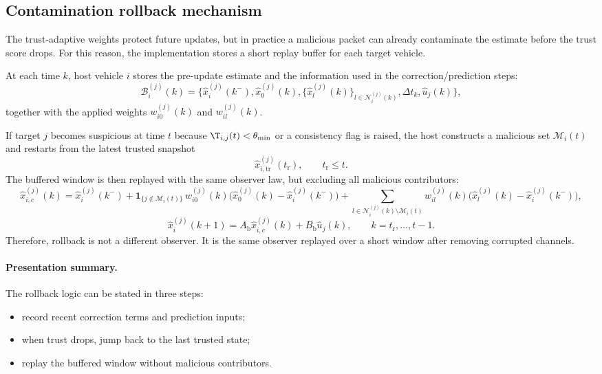 \subsection{Contamination rollback mechanism}\label{subsec:rollback}
The trust-adaptive weights protect future updates, but in practice a malicious packet can already contaminate the estimate before the trust score drops. For this reason, the implementation stores a short replay buffer for each target vehicle.

At each time $k$, host vehicle $i$ stores the pre-update estimate and the information used in the correction/prediction steps:
\begin{equation}\label{eq:rollback_buffer}
\mathcal{B}_{i}^{(j)}(k)=
\Big\{
\hat{x}_{i}^{(j)}(k^{-}),
\hat{x}_{0}^{(j)}(k),
\{\hat{x}_{l}^{(j)}(k)\}_{l\in\mathcal{N}_{i}^{(j)}(k)},
\Delta t_k,
\hat{u}_j(k)
\Big\},
\end{equation}
together with the applied weights $w_{i0}^{(j)}(k)$ and $w_{il}^{(j)}(k)$.

If target $j$ becomes suspicious at time $t$ because $\T_{i,j}(t)<\theta_{\min}$ or a consistency flag is raised, the host constructs a malicious set $\mathcal{M}_{i}(t)$ and restarts from the latest trusted snapshot
\begin{equation}
\hat{x}_{i,\mathrm{tr}}^{(j)}(t_{\mathrm{r}}), \qquad t_{\mathrm{r}}\le t.
\end{equation}
The buffered window is then replayed with the same observer law, but excluding all malicious contributors:
\begin{equation}\label{eq:rollback_correction}
\hat{x}_{i,c}^{(j)}(k)=
\hat{x}_{i}^{(j)}(k^{-})
+\mathbf{1}_{\{j\notin\mathcal{M}_{i}(t)\}}\,
w_{i0}^{(j)}(k)\big(\hat{x}_{0}^{(j)}(k)-\hat{x}_{i}^{(j)}(k^{-})\big)
+\sum_{l\in\mathcal{N}_{i}^{(j)}(k)\setminus\mathcal{M}_{i}(t)}
w_{il}^{(j)}(k)\big(\hat{x}_{l}^{(j)}(k)-\hat{x}_{i}^{(j)}(k^{-})\big),
\end{equation}
\begin{equation}\label{eq:rollback_prediction}
\hat{x}_{i}^{(j)}(k+1)=A_{\text{b}}\hat{x}_{i,c}^{(j)}(k)+B_{\text{b}}\hat{u}_j(k),
\qquad k=t_{\mathrm{r}},\ldots,t-1.
\end{equation}
Therefore, rollback is not a different observer. It is the same observer replayed over a short window after removing corrupted channels.

\paragraph{Presentation summary.}
The rollback logic can be stated in three steps:
\begin{itemize}
    \item record recent correction terms and prediction inputs;
    \item when trust drops, jump back to the last trusted state;
    \item replay the buffered window without malicious contributors.
\end{itemize}

